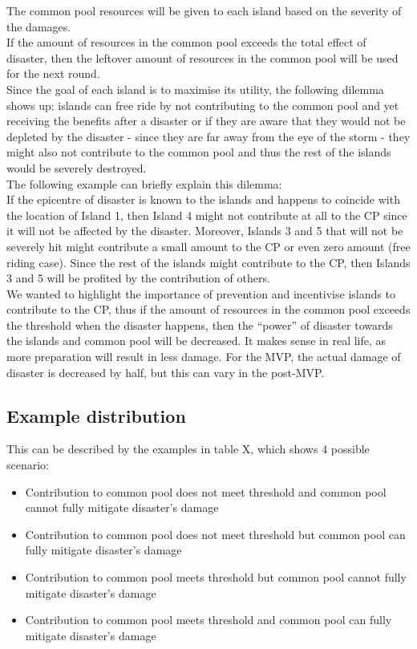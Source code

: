 The common pool resources will be given to each island based on the severity of the damages.\\

If the amount of resources in the common pool exceeds the total effect of disaster, then the leftover amount of resources in the common pool will be used for the next round.\\

Since the goal of each island is to maximise its utility, the following dilemma shows up: islands can free ride by not contributing to the common pool and yet receiving the benefits after a disaster or if they are aware that they would not be depleted by the disaster - since they are far away from the eye of the storm - they might also not contribute to the common pool and thus the rest of the islands would be severely destroyed. \\

The following example can briefly explain this dilemma:\\

If the epicentre of disaster is known to the islands and happens to coincide with the location of Island 1, then Island 4 might not contribute at all to the CP since it will not be affected by the disaster. Moreover, Islands 3 and 5 that will not be severely hit might contribute a small amount to the CP or even zero amount (free riding case). Since the rest of the islands might contribute to the CP, then Islands 3 and 5 will be profited by the contribution of others.\\

We wanted to highlight the importance of prevention and incentivise islands to contribute to the CP, thus if the amount of resources in the common pool exceeds the threshold when the disaster happens, then the “power” of disaster towards the islands and common pool will be decreased. It makes sense in real life, as more preparation will result in less damage. For the MVP, the actual damage of disaster is decreased by half, but this can vary in the post-MVP.\\

\subsection{Example distribution}
This can be described by the examples in table X, which shows 4 possible scenario:\\ 

\begin{itemize}
    \item Contribution to common pool does not meet threshold and common pool cannot fully mitigate disaster’s damage
    \item Contribution to common pool does not meet threshold but common pool can fully mitigate disaster’s damage
    \item Contribution to common pool meets threshold but common pool cannot fully mitigate disaster’s damage
    \item Contribution to common pool meets threshold and common pool can fully mitigate disaster’s damage
\end{itemize}

